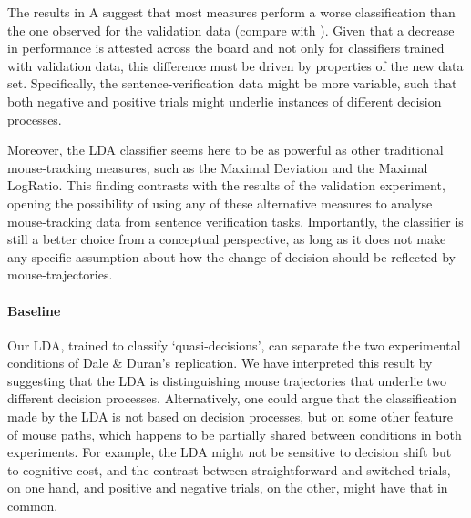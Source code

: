\documentclass{article}
\begin{document}
The results in A suggest that most measures perform a worse classification than the one observed for the validation data (compare with ). 
Given that a decrease in performance is attested across the board and not only for classifiers trained with validation data, 
this difference must be driven by properties of the new data set. Specifically, the sentence-verification data might be more variable, such that both negative and positive trials might underlie instances of different decision processes. 

Moreover, the LDA classifier seems here to be as powerful as other traditional mouse-tracking measures, such as the Maximal Deviation and the Maximal LogRatio. This finding contrasts with the results of the validation experiment, opening the possibility of using any of these alternative measures to analyse mouse-tracking data from sentence verification tasks. Importantly, the classifier is still a better choice from a conceptual perspective, as long as it does not make any specific assumption about how the change of decision should be reflected by mouse-trajectories.  

\paragraph{Baseline}
Our LDA, trained to classify `quasi-decisions', can separate the two experimental conditions of Dale \& Duran's replication. We have interpreted this result by suggesting that the LDA is distinguishing mouse trajectories that underlie two different decision processes. 
Alternatively, one could argue that the classification made by the LDA is not based on decision processes, but on some other feature of mouse paths, which happens to be partially shared between conditions in both experiments. 
For example, the LDA might not be sensitive to decision shift but to cognitive cost, and the contrast between straightforward and switched trials, on one hand, and positive and negative trials, on the other, might have that in common. 
\end{document}
